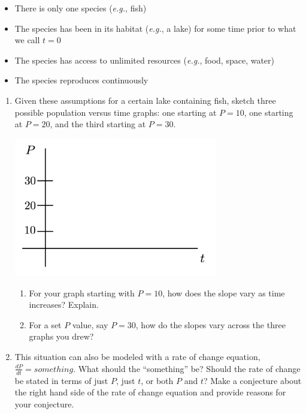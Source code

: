 \begin{itemize}
\item	There is only one species ({\em e.g.}, fish)
\item	The species has been in its habitat ({\em e.g.}, a lake) for some time prior to what we call $t = 0$
\item	The species has access to unlimited resources ({\em e.g.}, food, space, water) 
\item	The species reproduces continuously

\end{itemize}
\begin{enumerate}[resume]
\item	Given these assumptions for a certain lake containing fish, sketch three possible population versus time graphs: one starting at $P = 10$, one starting at $P = 20$, and the third starting at $P = 30$. \label{01problem2}

\begin{center}
\includegraphics[width=3.5in]{01/01FishGraph.png}
\end{center}
\begin{enumerate}
\item	For your graph starting with $P = 10$, how does the slope vary as time increases? Explain. \label{01problem2parta}
\vfill
\item	For a set $P$ value, say $P = 30$, how do the slopes vary across the three graphs you drew? \label{01problem2partb}
\vfill
\end{enumerate}
\item This situation can also be modeled with a rate of change equation, $\frac{dP}{dt}=something$. What should the ``something'' be? Should the rate of change be stated in terms of just $P$, just $t$, or both $P$ and $t$? Make a conjecture about the right hand side of the rate of change equation and provide reasons for your conjecture. \label{01problem3}
\end{enumerate}
\vfill

